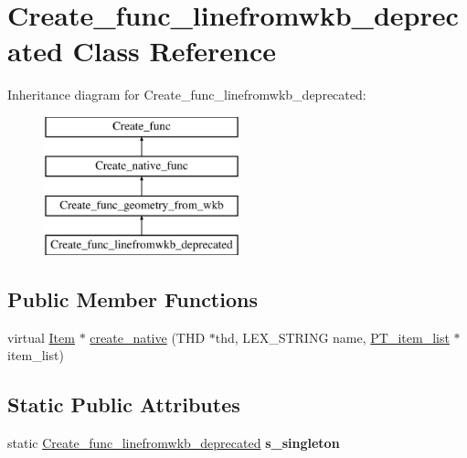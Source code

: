 \hypertarget{classCreate__func__linefromwkb__deprecated}{}\section{Create\+\_\+func\+\_\+linefromwkb\+\_\+deprecated Class Reference}
\label{classCreate__func__linefromwkb__deprecated}
Inheritance diagram for Create\+\_\+func\+\_\+linefromwkb\+\_\+deprecated\+:\begin{figure}[H]
\begin{center}
\leavevmode
\includegraphics[height=4.000000cm]{classCreate__func__linefromwkb__deprecated}
\end{center}
\end{figure}
\subsection*{Public Member Functions}
\begin{DoxyCompactItemize}
\item 
virtual \mbox{\hyperlink{classItem}{Item}} $\ast$ \mbox{\hyperlink{classCreate__func__linefromwkb__deprecated_a970684ef7c4db5f25bbd81be427b525d}{create\+\_\+native}} (T\+HD $\ast$thd, L\+E\+X\+\_\+\+S\+T\+R\+I\+NG name, \mbox{\hyperlink{classPT__item__list}{P\+T\+\_\+item\+\_\+list}} $\ast$item\+\_\+list)
\end{DoxyCompactItemize}
\subsection*{Static Public Attributes}
\begin{DoxyCompactItemize}
\item 
\mbox{\label{classCreate__func__linefromwkb__deprecated_a6b768aaa73dae7724bc484a7949e92a3}} 
static \mbox{\hyperlink{classCreate__func__linefromwkb__deprecated}{Create\+\_\+func\+\_\+linefromwkb\+\_\+deprecated}} {\bfseries s\+\_\+singleton}
\end{DoxyCompactItemize}
